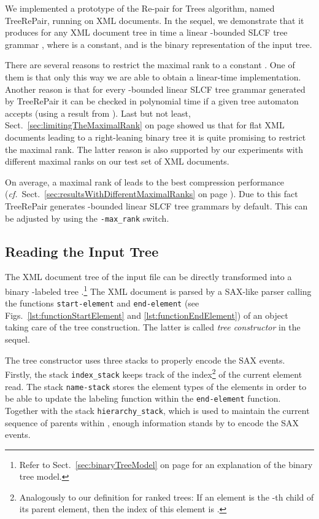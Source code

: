 \documentclass[12pt]{llncs}
\newcommand{\trp}{\mbox{TreeRePair}\xspace}
\newcommand{\cf}{\textit{cf.}~}
\begin{document}
We implemented a prototype of the Re-pair for Trees algorithm, named \trp, running on XML documents. In the sequel, we demonstrate that it produces for any XML document tree in  time a linear -bounded SLCF tree grammar , where  is a constant,  and  is the binary representation of the input tree.

There are several reasons to restrict the maximal rank to a constant . One of them is that only this way we are able to obtain a linear-time implementation. Another reason is that for every -bounded linear SLCF tree grammar  generated by \trp it can be checked in polynomial time if a given tree automaton accepts  (using a result from \cite{Lohrey2006complexity}). Last but not least, Sect.~\ref{sec:limitingTheMaximalRank} on page \pageref{sec:limitingTheMaximalRank} showed us that for flat XML documents leading to a right-leaning binary tree it is quite promising to restrict the maximal rank. The latter reason is also supported by our experiments with different maximal ranks on our test set of XML documents. 

On average, a maximal rank of  leads to the best compression performance (\cf Sect.~\ref{sec:resultsWithDifferentMaximalRanks} on page \pageref{sec:resultsWithDifferentMaximalRanks}). Due to this fact \trp generates -bounded linear SLCF tree grammars by default. This can be adjusted by using the \verb|-max_rank| switch.

\subsection{Reading the Input Tree}

The XML document tree of the input file can be directly transformed into a binary \mbox{-labeled} tree .\footnote{Refer to Sect.~\ref{sec:binaryTreeModel} on page \pageref{sec:binaryTreeModel} for an explanation of the binary tree model.} The XML document is parsed by a SAX-like parser calling the functions \verb|start-element| and \verb|end-element| (see Figs.~\ref{lst:functionStartElement} and \ref{lst:functionEndElement}) of an object taking care of the tree construction. The latter is called \emph{tree constructor} in the sequel. 

The tree constructor uses three stacks to properly encode the SAX events. Firstly, the stack \verb|index_stack| keeps track of the index\footnote{Analogously to our definition for ranked trees: If an element is the -th child of its parent element, then the index of this element is .} of the current element read. The stack \verb|name-stack| stores the element types of the elements in order to be able to update the labeling function  within the \verb|end-element| function. Together with the stack \verb|hierarchy_stack|, which is used to maintain the current sequence of parents within , enough information stands by to encode the SAX events.
\end{document}
